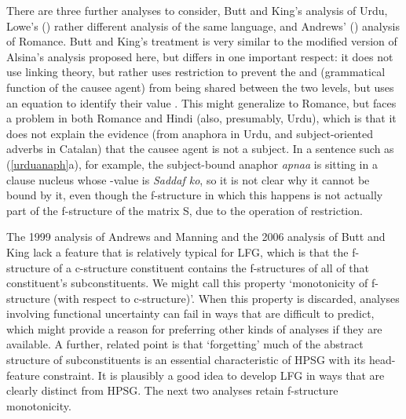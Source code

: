 \documentclass[output=paper,hidelinks]{langscibook}
\begin{document}
There are three further analyses to consider, Butt and King's \citeyear{ButtKing2006}
analysis of Urdu, Lowe's (\citeyear{Lowe2015}) rather different analysis
of the same language, and Andrews' (\citeyear{Andrews2018shs}) analysis of Romance.
Butt and King's treatment is very similar to the modified version of Alsina's analysis
proposed here, but differs in one important respect: it does not use linking theory, but rather
uses restriction to prevent the {\SUBJ} and  (grammatical function
of the causee agent) from being shared between the two levels, but uses an equation
to identify their value \citep[241, ex.~8]{ButtKing2006}.  This might generalize to Romance, 
but faces a problem in both Romance and Hindi (also, presumably, Urdu),
which is that it does not explain the evidence (from anaphora in Urdu,
and subject-oriented adverbs in Catalan) that the causee agent is not a subject.
In a sentence such as (\ref{urduanaph}a), for example, the subject-bound anaphor
\emph{apnaa} is sitting in a clause nucleus whose {\SUBJ}-value is \emph{Saddaf ko},
so it is not clear why it cannot be bound by it, even though the f-structure in which
this happens is not actually part of the f-structure of the matrix S, due to the
operation of restriction.

The 1999 analysis of Andrews and Manning and the 2006 analysis
of Butt and King lack a feature that is relatively typical for LFG, which is that the f-structure
of a c-structure constituent contains the f-structures of all of that constituent's subconstituents.
We might call this property `monotonicity of f-structure (with respect to c-structure)'.
When this property is discarded, analyses involving functional uncertainty can fail in ways that
are difficult to predict, which might provide a reason for preferring other kinds of
analyses if they are available.  A further, related point is that `forgetting' much
of the abstract structure of subconstituents is an essential characteristic of HPSG with
its head-feature constraint.  It is plausibly a good idea to develop LFG in ways that
are clearly distinct from HPSG. The next two analyses retain f-structure monotonicity.
\end{document}
